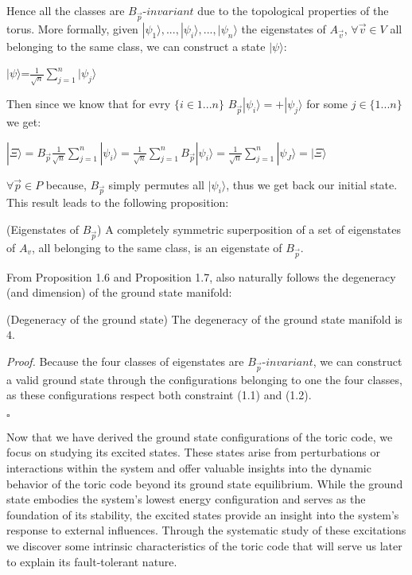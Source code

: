 \documentclass{Configuration_Files/PoliMi3i_thesis}
\begin{document}
Hence all the classes are $B_{\vec{p}} $-$invariant$ due to the topological properties of the torus. More formally, given $|\psi_1\rangle,...,|\psi_i\rangle,...,|\psi_n\rangle$ the eigenstates of $A_{\vec{v}}$, $\forall \vec{v} \in V$ all belonging to the same class, we can construct a state $|\psi\rangle$:

\begin{center}
	$|\psi\rangle$=$\frac{1}{\sqrt{n}}\sum_{j=1}^{n} |\psi_j\rangle$
\end{center} 

Then since we know that for evry $\{ i \in 1 ... n \}$ $B_{\vec{p}} |\psi_i\rangle=+|\psi_j\rangle$ for some $j \in \{ 1 ... n\}$ we get:

\begin{center}
	$|\Xi\rangle= B_{\vec{p}}  \frac{1}{\sqrt{n}} \sum_{j=1}^{n} |\psi_i\rangle = \frac{1}{\sqrt{n}} \sum_{j=1}^{n} B_{\vec{p}} |\psi_i\rangle = \frac{1}{\sqrt{n}} \sum_{j=1}^{n} |\psi_J\rangle =|\Xi\rangle$
\end{center}

$\forall \vec{p} \in P$ because, $B_{\vec{p}} $ simply permutes all $|\psi_i\rangle$, thus we get back our initial state. This result leads to the following proposition:

\begin{proposition}(Eigenstates of $B_{\vec{p}} $) A completely symmetric superposition of a set of eigenstates of $A_v$, all belonging to the same class, is an eigenstate of $B_{\vec{p}} $.
\end{proposition}

From Proposition 1.6 and Proposition 1.7, also naturally follows the degeneracy (and dimension) of the ground state manifold: \newline

\begin{proposition} (Degeneracy of the ground state) The degeneracy of the ground state manifold is $4$. 
\end{proposition}

\textit{Proof.}\newline
Because the four classes of eigenstates are $B_{\vec{p}} $-$invariant$, we can construct a valid ground state through the configurations belonging to one the four classes, as these configurations respect both constraint (1.1) and (1.2). 

\hfill $\square$
 
Now that we have derived the ground state configurations of the toric code, we focus on studying its excited states. These states arise from perturbations or interactions within the system and offer valuable insights into the dynamic behavior of the toric code beyond its ground state equilibrium. While the ground state embodies the system's lowest energy configuration and serves as the foundation of its stability, the excited states provide an insight into the system's response to external influences. 
Through the systematic study of these excitations we discover some intrinsic characteristics of the toric code that will serve us later to explain its fault-tolerant nature.
\end{document}
